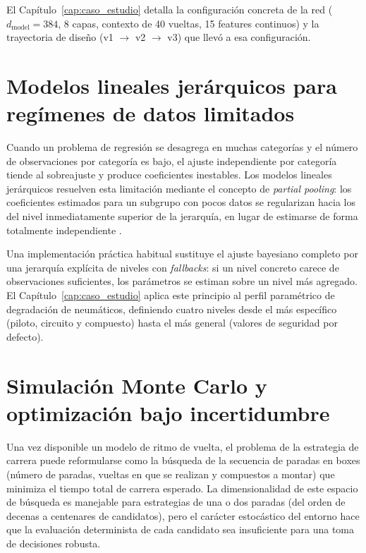 El Capítulo~\ref{cap:caso_estudio} detalla la configuración concreta de la red ($d_\text{model} = 384$, 8 capas, contexto de 40 vueltas, 15 features continuos) y la trayectoria de diseño (v1 $\to$ v2 $\to$ v3) que llevó a esa configuración.

\section{Modelos lineales jerárquicos para regímenes de datos limitados}
\label{sec:modelos_jerarquicos}

Cuando un problema de regresión se desagrega en muchas categorías y el número de observaciones por categoría es bajo, el ajuste independiente por categoría tiende al sobreajuste y produce coeficientes inestables. Los modelos lineales jerárquicos resuelven esta limitación mediante el concepto de \textit{partial pooling}: los coeficientes estimados para un subgrupo con pocos datos se regularizan hacia los del nivel inmediatamente superior de la jerarquía, en lugar de estimarse de forma totalmente independiente \cite{raudenbush2002hlm}.

Una implementación práctica habitual sustituye el ajuste bayesiano completo por una jerarquía explícita de niveles con \textit{fallbacks}: si un nivel concreto carece de observaciones suficientes, los parámetros se estiman sobre un nivel más agregado. El Capítulo~\ref{cap:caso_estudio} aplica este principio al perfil paramétrico de degradación de neumáticos, definiendo cuatro niveles desde el más específico (piloto, circuito y compuesto) hasta el más general (valores de seguridad por defecto).

\section{Simulación Monte Carlo y optimización bajo incertidumbre}
\label{sec:monte_carlo}

Una vez disponible un modelo de ritmo de vuelta, el problema de la estrategia de carrera puede reformularse como la búsqueda de la secuencia de paradas en boxes (número de paradas, vueltas en que se realizan y compuestos a montar) que minimiza el tiempo total de carrera esperado. La dimensionalidad de este espacio de búsqueda es manejable para estrategias de una o dos paradas (del orden de decenas a centenares de candidatos), pero el carácter estocástico del entorno hace que la evaluación determinista de cada candidato sea insuficiente para una toma de decisiones robusta.

